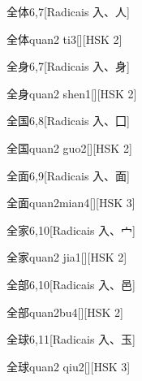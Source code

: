 \begin{entry}{全体}{6,7}[Radicais ⼊、⼈]
  \begin{phonetics}{全体}{quan2 ti3}[][HSK 2]
  \end{phonetics}
\end{entry}

\begin{entry}{全身}{6,7}[Radicais ⼊、⾝]
  \begin{phonetics}{全身}{quan2 shen1}[][HSK 2]
  \end{phonetics}
\end{entry}

\begin{entry}{全国}{6,8}[Radicais ⼊、⼞]
  \begin{phonetics}{全国}{quan2 guo2}[][HSK 2]
  \end{phonetics}
\end{entry}

\begin{entry}{全面}{6,9}[Radicais ⼊、⾯]
  \begin{phonetics}{全面}{quan2mian4}[][HSK 3]
  \end{phonetics}
\end{entry}

\begin{entry}{全家}{6,10}[Radicais ⼊、⼧]
  \begin{phonetics}{全家}{quan2 jia1}[][HSK 2]
  \end{phonetics}
\end{entry}

\begin{entry}{全部}{6,10}[Radicais ⼊、⾢]
  \begin{phonetics}{全部}{quan2bu4}[][HSK 2]
  \end{phonetics}
\end{entry}

\begin{entry}{全球}{6,11}[Radicais ⼊、⽟]
  \begin{phonetics}{全球}{quan2 qiu2}[][HSK 3]
  \end{phonetics}
\end{entry}


